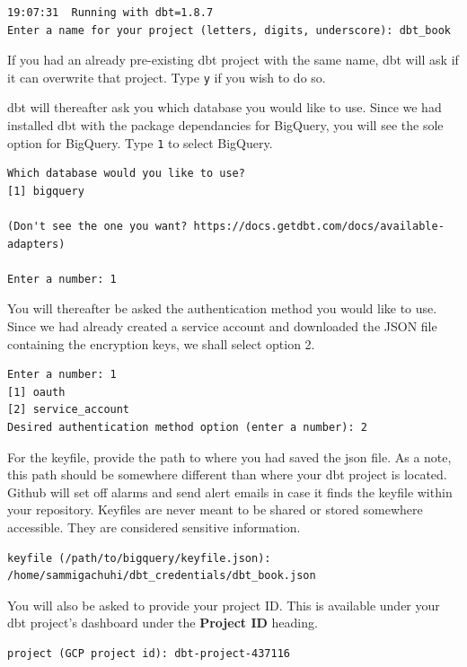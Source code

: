 \documentclass[
]{book}
\begin{document}
\begin{verbatim}
19:07:31  Running with dbt=1.8.7
Enter a name for your project (letters, digits, underscore): dbt_book
\end{verbatim}

If you had an already pre-existing dbt project with the same name, dbt will ask if it can overwrite that project. Type \texttt{y} if you wish to do so.

dbt will thereafter ask you which database you would like to use. Since we had installed dbt with the package dependancies for BigQuery, you will see the sole option for BigQuery. Type \texttt{1} to select BigQuery.

\begin{verbatim}
Which database would you like to use?
[1] bigquery

(Don't see the one you want? https://docs.getdbt.com/docs/available-adapters)

Enter a number: 1
\end{verbatim}

You will thereafter be asked the authentication method you would like to use. Since we had already created a service account and downloaded the JSON file containing the encryption keys, we shall select option 2.

\begin{verbatim}
Enter a number: 1
[1] oauth
[2] service_account
Desired authentication method option (enter a number): 2
\end{verbatim}

For the keyfile, provide the path to where you had saved the json file. As a note, this path should be somewhere different than where your dbt project is located. Github will set off alarms and send alert emails in case it finds the keyfile within your repository. Keyfiles are never meant to be shared or stored somewhere accessible. They are considered sensitive information.

\begin{verbatim}
keyfile (/path/to/bigquery/keyfile.json): /home/sammigachuhi/dbt_credentials/dbt_book.json
\end{verbatim}

You will also be asked to provide your project ID. This is available under your dbt project's dashboard under the \textbf{Project ID} heading.

\begin{verbatim}
project (GCP project id): dbt-project-437116
\end{verbatim}
\end{document}
